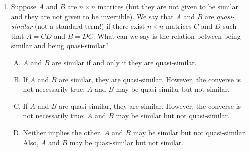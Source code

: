\documentclass[10pt]{amsart}
\begin{document}
\begin{enumerate}
  {\em Answer}: Option (B)

  {\em Explanation}: If $A$ is similar to $B$, that means there exists
  a $n \times n$ invertible matrix $S$ such that $A = SBS^{-1}$. Thus,
  $A^2 = (SBS^{-1})^2 = SB^2S^{-1}$, so that $A^2$ and $B^2$ are both
  similar.

  However, $A^2$ being similar to $B^2$ does not imply that $A$ is
  similar to $B$. For instance, consider:

  $$A = \left[\begin{matrix} 0 & 1 \\ 0 & 0 \\\end{matrix}\right], B = \left[\begin{matrix} 0 & 0 \\ 0 & 0 \\\end{matrix}\right]$$

  Note that both $A^2$ and $B^2$ are the zero matrix, so $A^2$ and
  $B^2$ are similar. However, $A$ is not similar to $B$. In fact, $B$,
  being the zero matrix, is the only matrix in its similarity class,
  for obvious reasons.

  {\em Performance review}: 9 out of 23 people got this. 10 chose (A),
  4 chose (D).

  {\em Historical note (last time)}: $10$ out of $19$ got this. $5$ chose (D),
  $2$ chose (A), $1$ each chose (C) and (E).

\item Suppose $A$ and $B$ are $n \times n$ matrices (but they are not
  given to be similar and they are not given to be invertible). We say
  that $A$ and $B$ are {\em quasi-similar} (not a standard term!) if
  there exist $n \times n$ matrices $C$ and $D$ such that $A = CD$ and
  $B = DC$. What can we say is the relation between being similar and
  being quasi-similar?

  \begin{enumerate}[(A)]
  \item $A$ and $B$ are similar if and only if they are quasi-similar.
  \item If $A$ and $B$ are similar, they are quasi-similar. However,
    the converse is not necessarily true: $A$ and $B$ may be
    quasi-similar but not similar.
  \item If $A$ and $B$ are quasi-similar, they are similar. However,
    the converse is not necessarily true: $A$ and $B$ may be similar
    but not quasi-similar.
  \item Neither implies the other. $A$ and $B$ may be similar but not
    quasi-similar. Also, $A$ and $B$ may be quasi-similar but not
    similar.
  \end{enumerate}


\end{enumerate}
\end{document}

